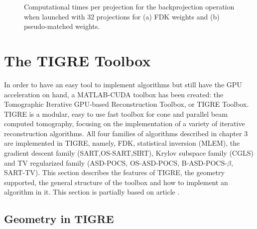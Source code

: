 \begin{figure}
\centering
{}

\caption[Computational times of the backprojection operator, multiple projections]{\label{fig:backprojection32times} Computational times per projection for the backprojection operation when launched with 32 projections for (a) FDK weights and (b) pseudo-matched weights.} 
\end{figure}


\FloatBarrier
\section{The TIGRE Toolbox}

In order to have an easy tool to implement algorithms but still have the GPU acceleration on hand, a MATLAB-CUDA toolbox has been created: the Tomographic Iterative GPU-based Reconstruction Toolbox, or TIGRE Toolbox\cite{TIGREweb}. TIGRE is a modular, easy to use fast toolbox for cone and parallel beam computed tomography, focusing on the implementation of a variety of iterative reconstruction algorithms. All four families of algorithms described in chapter 3 are implemented in TIGRE, namely, FDK, statistical inversion (MLEM), the gradient descent family (SART,OS-SART,SIRT), Krylov subspace family (CGLS) and TV regularized family (\mbox{ASD-POCS},  \mbox{OS-ASD-POCS}, \mbox{B-ASD-POCS-$\beta$}, SART-TV). This section describes the features of TIGRE, the geometry supported, the general structure of the toolbox and how to implement an algorithm in it. This section is partially based on article \cite{TIGRE}.

\subsection{Geometry in TIGRE}

